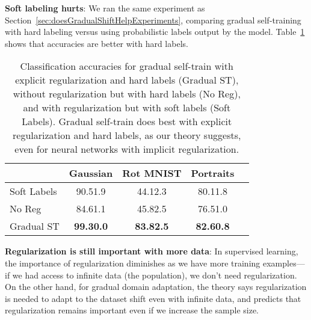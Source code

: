 \documentclass[11pt]{article}
\begin{document}
\textbf{Soft labeling hurts}: We ran the same experiment as Section~\ref{sec:doesGradualShiftHelpExperiments}, comparing gradual self-training with hard labeling versus using probabilistic labels output by the model. Table~\ref{tab:regHardLabelImportant} shows that accuracies are better with hard labels.

\begin{table}[t]
\caption{
Classification accuracies for gradual self-train with explicit regularization and hard labels (Gradual ST), without regularization but with hard labels (No Reg), and with regularization but with soft labels (Soft Labels).
Gradual self-train does best with explicit regularization and hard labels, as our theory suggests, even for neural networks with implicit regularization.
}
\label{tab:regHardLabelImportant}
\vskip 0.15in
\begin{center}
\begin{small}
\begin{sc}
\begin{tabular}{lcccr}
\toprule
 & Gaussian & Rot MNIST & Portraits \\
\midrule
Soft Labels         & 90.51.9  & 44.12.3 & 80.11.8 \\
No Reg   & 84.61.1  & 45.82.5 & 76.51.0 \\
Gradual ST           & \textbf{99.30.0}  & \textbf{83.82.5} & \textbf{82.60.8} \\
\bottomrule
\end{tabular}
\end{sc}
\end{small}
\end{center}
\vskip -0.1in
\end{table}

\textbf{Regularization is still important with more data}:
In supervised learning, the importance of regularization diminishes as we have more training examples---if we had access to infinite data (the population), we don't need regularization.
On the other hand, for gradual domain adaptation, the theory says regularization is needed to adapt to the dataset shift even with infinite data, and predicts that regularization remains important even if we increase the sample size.
\end{document}
